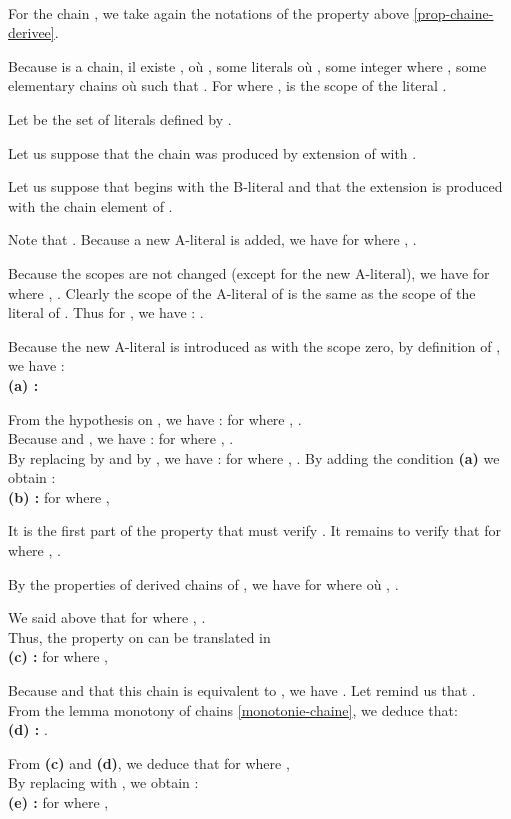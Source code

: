 \documentclass{article}
\newenvironment{preuve}{\noindent {\em Proof :}\ }{{\hfill
    }\vspace{.5pc}} \newcommand{\sg}{\!\!<\!\!}
\begin{document}
\begin{preuve}

For the chain , we take again the notations of the property above \ref{prop-chaine-derivee}.

Because  is a chain,  
il existe , où ,  some literals  où , some integer  where , 
some elementary chains 
  où  such that .
For  where ,  is the scope of the literal .

Let  be the set of literals defined by 
.

\begin{itemrond}
\item Let us suppose that the chain  was produced by extension of  with . 

Let us suppose that  begins with the B-literal  and that the extension is produced with the chain 
element of . 

Note that .
Because a new A-literal   is added, we have for  where , .

Because the scopes are not changed (except for the new A-literal), we have for  where  ,
. 
Clearly the scope of the  A-literal of  is the same as the scope of the  literal
of . Thus for  , we have : . 

Because the new A-literal is introduced as   with the scope zero, by definition of 
 , we have :\\
\textbf{(a) : } 

From the hypothesis on , we have : for   where , . \\ 
Because  and , we have : for   where , .\\
By replacing  by  and  by , we have : for  where  , . 
By adding the condition \textbf{(a)} we obtain :\\
\textbf{(b) : } for  where , 

It is the first part of the property that must verify . It remains to verify that 
for  where , .

By the properties of derived chains of , we have for  where
  où , 
. 

We said above that for  where , .\\
Thus, the property on  can be translated in \\
\textbf{(c) : } for  where , 

Because  and that this chain is equivalent to  , we have
. Let remind us that . 
From the lemma monotony of chains \ref{monotonie-chaine}, we deduce that:\\
\textbf{(d) : } .

From \textbf{(c)} and \textbf{(d)}, we deduce that for  where 
, \\
By replacing  with , we obtain :\\
\textbf{(e) : } for  where , 


\end{itemrond}
\end{preuve}
\end{document}
